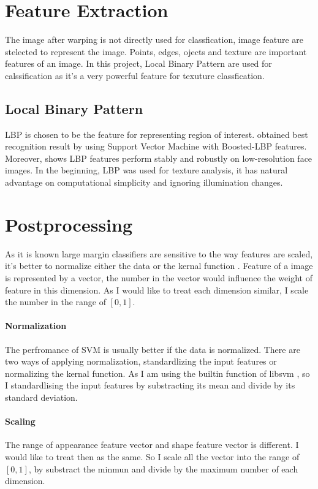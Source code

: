 \section{Feature Extraction}
The image after warping is not directly used for classfication, image feature are stelected to represent the image. Points, edges, ojects and texture are important features of an image. In this project, Local Binary Pattern are used for calssification as it's a very powerful feature for texuture classfication. 
\subsection{Local Binary Pattern}
LBP is chosen to be the feature for representing region of interest. \cite{shan2009facial} obtained best recognition result by using Support Vector Machine with Boosted-LBP features. Moreover, \cite{shan2009facial} shows LBP features perform stably and robustly on low-resolution face images. In the beginning, LBP was used for texture analysis, it has natural advantage on computational simplicity and ignoring illumination changes.
\newpage
\section{Postprocessing}
As it is known large margin classifiers are sensitive to the way features are scaled, it's better to normalize either the data or the kernal function \cite{ben2010user}. Feature of a image is represented by a vector, the number in the vector would influence the weight of feature in this dimension. As I would like to treat each dimension similar, I scale the number in the range of $[0,1]$.
\paragraph{Normalization}
The perfromance of SVM is usually better if the data is normalized. There are two ways of applying normalization, standardlizing the input features or normalizing the kernal function. As I am using the builtin function of libsvm \cite{CC01a}, so I standardlising the input features by substracting its mean and divide by its standard deviation.
\paragraph{Scaling}
The range of appearance feature vector and shape feature vector is different. I would like to treat then as the same. So I scale all the vector into the range of $[0, 1]$, by substract the minmun and divide by the maximum number of each dimension.